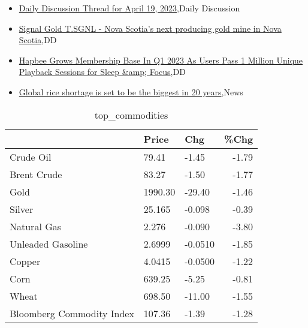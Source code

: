 \documentclass{article}%
\begin{document}
%
\begin{itemize}%
\item%
\href{https://reddit.com/r/wallstreetbets/comments/12rny50/daily\_discussion\_thread\_for\_april\_19\_2023/}{Daily Discussion Thread for April 19, 2023},Daily Discussion%
\item%
\href{https://reddit.com/r/Baystreetbets/comments/12r2jy3/signal\_gold\_tsgnl\_nova\_scotias\_next\_producing/}{Signal Gold T.SGNL - Nova Scotia's next producing gold mine in Nova Scotia},DD%
\item%
\href{https://reddit.com/r/Baystreetbets/comments/12qtb44/hapbee\_grows\_membership\_base\_in\_q1\_2023\_as\_users/}{Hapbee Grows Membership Base In Q1 2023 As Users Pass 1 Million Unique Playback Sessions for Sleep \&amp; Focus},DD%
\item%
\href{https://reddit.com/r/Economics/comments/12rg50e/global\_rice\_shortage\_is\_set\_to\_be\_the\_biggest\_in/}{Global rice shortage is set to be the biggest in 20 years},News%
\end{itemize}%


\begin{table}[htbp]%
\caption{top\_commodities}%
\centering%
\begin{adjustbox}{width=1\textwidth}%
\begin{tabular}{lllr}
\toprule
                          &   Price &     Chg &  \%Chg \\
\midrule
               Crude Oil  &   79.41 &   -1.45 & -1.79 \\
             Brent Crude  &   83.27 &   -1.50 & -1.77 \\
                    Gold  & 1990.30 &  -29.40 & -1.46 \\
                  Silver  &  25.165 &  -0.098 & -0.39 \\
             Natural Gas  &   2.276 &  -0.090 & -3.80 \\
       Unleaded Gasoline  &  2.6999 & -0.0510 & -1.85 \\
                  Copper  &  4.0415 & -0.0500 & -1.22 \\
                    Corn  &  639.25 &   -5.25 & -0.81 \\
                   Wheat  &  698.50 &  -11.00 & -1.55 \\
Bloomberg Commodity Index &  107.36 &   -1.39 & -1.28 \\
\bottomrule
\end{tabular}
%
\end{adjustbox}%
\end{table}
\end{document}
